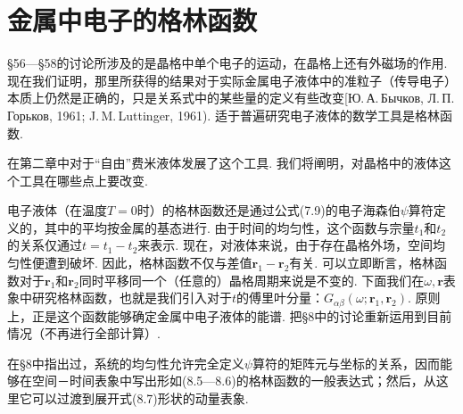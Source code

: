 \setcounter{section}{61}

\section{金属中电子的格林函数}

§56—§58的讨论所涉及的是晶格中单个电子的运动，在晶格上还有外磁场的作用. 现在我们证明，那里所获得的结果对于实际金属电子液体中的准粒子（传导电子）本质上仍然是正确的，只是关系式中的某些量的定义有些改变[Ю.\,А.\,Бычков, Л.\,П.\,Горьков, 1961; J.\,M.\,Luttinger, 1961). 适于普遍研究电子液体的数学工具是格林函数.

在第二章中对于“自由”费米液体发展了这个工具. 我们将阐明，对晶格中的液体这个工具在哪些点上要改变.

电子液体（在温度$T=0$时）的格林函数还是通过公式(7.9)的电子海森伯$\psi$算符定义的，其中的平均按金属的基态进行. 由于时间的均匀性，这个函数与宗量$t_1$和$t_2$的关系仅通过$t=t_1-t_2$来表示. 现在，对液体来说，由于存在晶格外场，空间均匀性便遭到破坏. 因此，格林函数不仅与差值$\bm{r}_1-\bm{r}_2$有关. 可以立即断言，格林函数对于$\bm{r}_1$和$\bm{r}_2$同时平移同一个（任意的）晶格周期来说是不变的. 下面我们在$\omega,\bm{r}$表象中研究格林函数，也就是我们引入对于$t$的傅里叶分量：$G_{\alpha\beta}(\omega;\bm{r}_1,\bm{r}_2)$. 原则上，正是这个函数能够确定金属中电子液体的能谱. 把§8中的讨论重新运用到目前情况（不再进行全部计算）.

在§8中指出过，系统的均匀性允许完全定义$\psi$算符的矩阵元与坐标的关系，因而能够在空间－时间表象中写出形如(8.5—8.6)的格林函数的一般表达式；然后，从这里它可以过渡到展开式(8.7)形状的动量表象.

